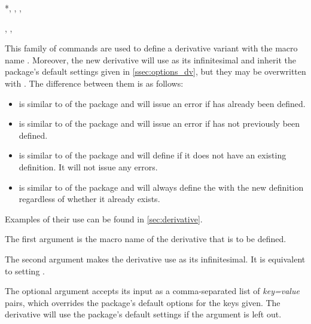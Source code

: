\begin{function}*{\NewDerivative, \RenewDerivative, \ProvideDerivative, \DeclareDerivative}
	\begin{syntax}
		, , 
	\end{syntax}
	This family of commands are used to define a derivative variant with the macro name . Moreover, the new derivative will use  as its infinitesimal and inherit the package's default settings given in \cref{ssec:options_dv}, but they may be overwritten with . The difference between them is as follows:
	\begin{itemize}
		\item {} is similar to  of the  package and will issue an error if  has already been defined.
		\item {} is similar to  of the  package and will issue an error if  has not previously been defined.
		\item {} is similar to  of the  package and will define  if it does not have an existing definition. It will not issue any errors.
		\item {} is similar to  of the  package and will always define the  with the new definition regardless of whether it already exists.
	\end{itemize}
	Examples of their use can be found in \cref{sec:derivative}.
	
	\begin{argument}{1}
		The first argument is the macro name of the derivative that is to be defined.
	\end{argument}
	
	\begin{argument}{2}
		The second argument makes the derivative  use  as its infinitesimal. It is equivalent to setting .
	\end{argument}
	
	\begin{argument}{3}
		The optional argument accepts its input as a comma-separated list of \emph{key=value} pairs, which overrides the package's default options for the keys given. The derivative  will use the package's default settings if the argument is left out.
	\end{argument}
\end{function}

